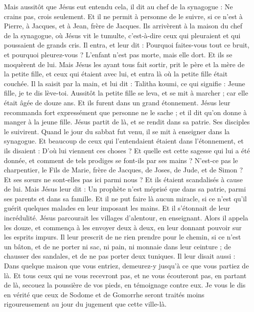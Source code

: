 \begin{multicols}{2}
Mais aussitôt que Jésus eut entendu cela, il dit au chef de la synagogue : Ne crains pas, crois seulement.
Et il ne permit à personne de le suivre, si ce n’est à Pierre, à Jacques, et à Jean, frère de Jacques.
Ils arrivèrent à la maison du chef de la synagogue, où Jésus vit le tumulte, c'est-à-dire ceux qui pleuraient et qui poussaient de grands cris.
Il entra, et leur dit : Pourquoi faites-vous tout ce bruit, et pourquoi pleurez-vous ? L’enfant n'est pas morte, mais elle dort.
Et ils se moquèrent de lui. Mais Jésus les ayant tous fait sortir, prit le père et la mère de la petite fille, et ceux qui étaient avec lui, et entra là où la petite fille était couchée.
Il la saisit par la main, et lui dit : Talitha koumi, ce qui signifie : Jeune fille, je te dis lève-toi.
Aussitôt la petite fille se leva, et se mit à marcher ; car elle était âgée de douze ans. Et ils furent dans un grand étonnement.
Jésus leur recommanda fort expressément que personne ne le sache ; et il dit qu'on donne à manger à la jeune fille.
\VerseOne{}Jésus partit de là, et se rendit dans sa patrie. Ses disciples le suivirent.
Quand le jour du sabbat fut venu, il se mit à enseigner dans la synagogue. Et beaucoup de ceux qui l'entendaient étaient dans l'étonnement, et ils disaient : D'où lui viennent ces choses ? Et quelle est cette sagesse qui lui a été donnée, et comment de tels prodiges se font-ils par ses mains ?
N’est-ce pas le charpentier, le Fils de Marie, frère de Jacques, de Joses, de Jude, et de Simon ? Et ses sœurs ne sont-elles pas ici parmi nous ? Et ils étaient scandalisés à cause de lui.
Mais Jésus leur dit : Un prophète n'est méprisé que dans sa patrie, parmi ses parents et dans sa famille.
Et il ne put faire là aucun miracle, si ce n’est qu'il guérit quelques malades en leur imposant les mains.
Et il s'étonnait de leur incrédulité. Jésus parcourait les villages d'alentour, en enseignant.
Alors il appela les douze, et commença à les envoyer deux à deux, en leur donnant pouvoir sur les esprits impurs.
Il leur prescrit de ne rien prendre pour le chemin, si ce n’est un bâton, et de ne porter ni sac, ni pain, ni monnaie dans leur ceinture ;
de chausser des sandales, et de ne pas porter deux tuniques.
Il leur disait aussi : Dans quelque maison que vous entriez, demeurez-y jusqu'à ce que vous partiez de là.
Et tous ceux qui ne vous recevront pas, et ne vous écouteront pas, en partant de là, secouez la poussière de vos pieds, en témoignage contre eux. Je vous le dis en vérité que ceux de Sodome et de Gomorrhe seront traités moins rigoureusement au jour du jugement que cette ville-là.

\end{multicols}
